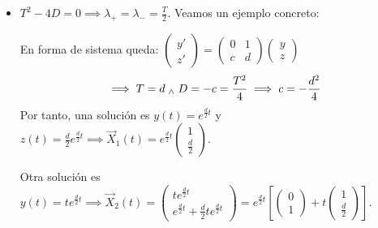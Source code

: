 \begin{itemize}
\begin{enumerate}
	      \end{enumerate}
	\item {} $T^2 - 4D = 0 \implies \lambda_+ = \lambda_- = \frac{T}{2}$. Veamos un ejemplo concreto: \vspace{-0.5cm}
	      \begin{ejem}[$y'' - dy - cy = 0$]
		      En forma de sistema queda: $\begin{pmatrix}
				      y' \\
				      z'
			      \end{pmatrix} = \begin{pmatrix}
				      0 & 1 \\
				      c & d
			      \end{pmatrix} \begin{pmatrix}
				      y \\
				      z
			      \end{pmatrix}$
		      \[\implies T = d \; _{\wedge} \; D = -c = \frac{T^2}{4} \implies c = -\frac{d^2}{4}\]
		      Por tanto, una solución es $y(t) = e^{\frac{d}{2}t}$ y $z(t) = \frac{d}{2} e^{\frac{d}{2}t} \implies \vec{X}_1(t) = e^{\frac{d}{2}t} \begin{pmatrix}
				      1 \\
				      \frac{d}{2}
			      \end{pmatrix}$.

		      Otra solución es $y(t) = t e^{\frac{d}{2}t} \implies \vec{X}_2(t) = \begin{pmatrix}
				      te^{\frac{d}{2}t} \\
				      e^{\frac{d}{2}t} + \frac{d}{2}te^{\frac{d}{2}t}
			      \end{pmatrix} = e^{\frac{d}{2}t} \left[\begin{pmatrix}
					      0 \\
					      1
				      \end{pmatrix} + t \begin{pmatrix}
					      1 \\
					      \frac{d}{2}
				      \end{pmatrix}\right]$.


\end{ejem}
\end{itemize}
